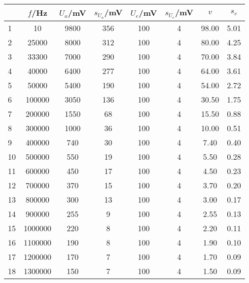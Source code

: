\begin{center}
    \begin{tabular}{l | c c c c c | c c}
        {} &       $f$/Hz &  $U_a$/mV &  $s_{U_a}$/mV &  $U_e$/mV &  $s_{U_e}$/mV &   $v$ &   $s_v$ \\
        \hline
        1  &       10 &  9800 &       356 &     100 &         4 &  98.00 &  5.01 \\    
        2  &    25000 &  8000 &       312 &     100 &         4 &  80.00 &  4.25 \\    
        3  &    33300 &  7000 &       290 &     100 &         4 &  70.00 &  3.84 \\    
        4  &    40000 &  6400 &       277 &     100 &         4 &  64.00 &  3.61 \\    
        5  &    50000 &  5400 &       190 &     100 &         4 &  54.00 &  2.72 \\    
        6  &   100000 &  3050 &       136 &     100 &         4 &  30.50 &  1.75 \\    
        7  &   200000 &  1550 &        68 &     100 &         4 &  15.50 &  0.88 \\    
        8  &   300000 &  1000 &        36 &     100 &         4 &  10.00 &  0.51 \\    
        9  &   400000 &   740 &        30 &     100 &         4 &   7.40 &  0.40 \\    
        10 &   500000 &   550 &        19 &     100 &         4 &   5.50 &  0.28 \\    
        11 &   600000 &   450 &        17 &     100 &         4 &   4.50 &  0.23 \\    
        12 &   700000 &   370 &        15 &     100 &         4 &   3.70 &  0.20 \\    
        13 &   800000 &   300 &        13 &     100 &         4 &   3.00 &  0.17 \\    
        14 &   900000 &   255 &         9 &     100 &         4 &   2.55 &  0.13 \\    
        15 &  1000000 &   220 &         8 &     100 &         4 &   2.20 &  0.11 \\    
        16 &  1100000 &   190 &         8 &     100 &         4 &   1.90 &  0.10 \\    
        17 &  1200000 &   170 &         7 &     100 &         4 &   1.70 &  0.09 \\    
        18 &  1300000 &   150 &         7 &     100 &         4 &   1.50 &  0.09 \\    

\end{tabular}
\end{center}
